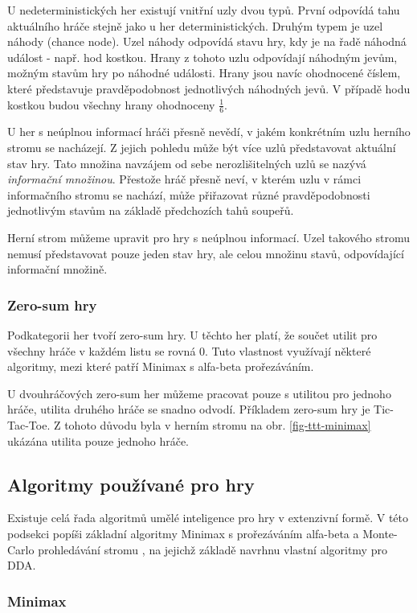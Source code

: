 U nedeterministických her existují vnitřní uzly dvou typů. První odpovídá tahu aktuálního hráče stejně jako u her deterministických. Druhým typem je uzel náhody (chance node). Uzel náhody odpovídá stavu hry, kdy je na řadě náhodná událost - např. hod kostkou. Hrany z tohoto uzlu odpovídají náhodným jevům, možným stavům hry po náhodné události. Hrany jsou navíc ohodnocené číslem, které představuje pravděpodobnost jednotlivých náhodných jevů. V případě hodu kostkou budou všechny hrany ohodnoceny $\frac{1}{6}$.

U her s neúplnou informací hráči přesně nevědí, v jakém konkrétním uzlu herního stromu se nacházejí. Z jejich pohledu může být více uzlů představovat aktuální stav hry. Tato množina navzájem od sebe nerozlišitelných uzlů se nazývá \emph{informační množinou}. Přestože hráč přesně neví, v kterém uzlu v rámci informačního stromu se nachází, může přiřazovat různé pravděpodobnosti jednotlivým stavům na základě předchozích tahů soupeřů.

Herní strom můžeme upravit pro hry s neúplnou informací. Uzel takového stromu nemusí představovat pouze jeden stav hry, ale celou množinu stavů, odpovídající informační množině.

\subsubsection{Zero-sum hry}

Podkategorii her tvoří zero-sum hry. U těchto her platí, že součet utilit pro všechny hráče v každém listu se rovná 0. Tuto vlastnost využívají některé algoritmy, mezi které patří Minimax s alfa-beta prořezáváním.

U dvouhráčových zero-sum her můžeme pracovat pouze s utilitou pro jednoho hráče, utilita druhého hráče se snadno odvodí. Příkladem zero-sum hry je Tic-Tac-Toe. Z tohoto důvodu byla v herním stromu na obr. \ref{fig-ttt-minimax} ukázána utilita pouze jednoho hráče.

\subsection{Algoritmy používané pro hry}

Existuje celá řada algoritmů umělé inteligence pro hry v extenzivní formě. V této podsekci popíši základní algoritmy Minimax s prořezáváním alfa-beta \cite{minimax} a Monte-Carlo prohledávání stromu \cite{montecarlo}, na jejichž základě navrhnu vlastní algoritmy pro DDA.

\subsubsection{Minimax}

